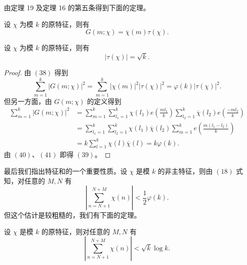 由定理 19 及定理 16 的第五条得到下面的定理。

\begin{theorem}[原文 定理 20]
	设 $\chi$ 为模 $k$ 的原特征，则有
	\begin{equation}
		G(m;\chi)=\overline{\chi}(m)\tau(\chi).
		\tag{38}
	\end{equation}
\end{theorem}

\begin{theorem}[原文 定理 21]
	设 $\chi$ 为模 $k$ 的原特征，则有
	\begin{equation}
		|\tau(\chi)|=\sqrt{k}.
		\tag{39}
	\end{equation}
\end{theorem}

\begin{proof}
	由 \((38)\) 得到
	\begin{equation}
		\sum_{m=1}^{k}|G(m;\chi)|^2
		=
		\sum_{m=1}^{k}|\chi(m)|^2|\tau(\chi)|^2
		=
		\varphi(k)|\tau(\chi)|^2.
		\tag{40}
	\end{equation}
	但另一方面，由 $G(m;\chi)$ 的定义得到
	\begin{equation}
	\begin{aligned}
		\sum_{m=1}^{k}|G(m;\chi)|^2
		&=
		\sum_{m=1}^{k}
		\sum_{l_1=1}^{k}\chi(l_1)e\left(\frac{ml_1}{k}\right)
		\sum_{l_2=1}^{k}\overline{\chi}(l_2)e\left(\frac{-ml_2}{k}\right)  \\
		&=
		\sum_{l_1=1}^{k}\sum_{l_2=1}^{k}
		\chi(l_1)\overline{\chi}(l_2)
		\sum_{m=1}^{k}e\left(\frac{m(l_1-l_2)}{k}\right)  \\
		&=
		k\sum_{l=1}^{k}\chi(l)\overline{\chi}(l)
		=
		k\varphi(k).
	\end{aligned}
	\tag{41}
	\end{equation}
	由 \((40)\)、\((41)\) 即得 \((39)\)。
\end{proof}

最后我们指出特征和的一个重要性质。设 $\chi$ 是模 $k$ 的非主特征，则由 \((18)\) 式知，对任意的 $M,N$ 有
\begin{equation}
	\left|
	\sum_{n=N+1}^{N+M}\chi(n)
	\right|
	<
	\frac{1}{2}\varphi(k).
	\tag{42}
\end{equation}
但这个估计是较粗糙的，我们有下面的定理。

\begin{theorem}[原文 定理 22]
	设 $\chi$ 是模 $k$ 的原特征，则对任意的 $M,N$ 有
	\begin{equation}
		\left|
		\sum_{n=N+1}^{N+M}\chi(n)
		\right|
		<
		\sqrt{k}\log k.
		\tag{43}
	\end{equation}
\end{theorem}

